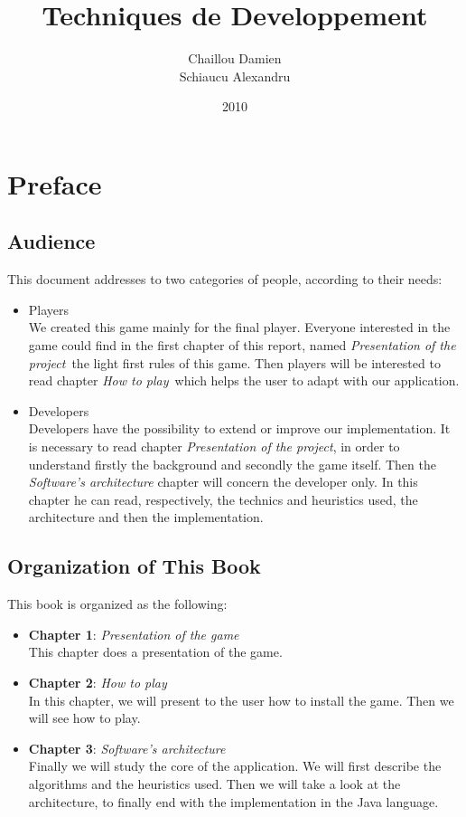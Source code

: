 \documentclass[a4paper,10pt]{report}
\title{Techniques de Developpement}
\author{Chaillou Damien \\ Schiaucu Alexandru}
\date{2010}
\newcommand{\empha}[1]{\textbf{\color{blue}{#1}}}
\begin{document}
	\maketitle
	\tableofcontents


	\chapter*{Preface}

		\section{Audience}
			
			This document addresses to two categories of people, according to their needs:
			\begin{itemize}
				\item Players\\
					We created this game mainly for the final player. Everyone interested in the \empha{Go} game could find in the first chapter of this report, named  \textsl{Presentation of the project}\ the light first rules of this game. Then players will be interested to read chapter \textsl{How to play}\, which helps the user to adapt with our application.

				\item Developers\\
					Developers have the possibility to extend or improve our implementation. It is necessary to read chapter \textsl{Presentation of the project}, in order to understand firstly the background and secondly the game itself. Then the \textsl{Software's architecture} chapter will concern the developer only. In this chapter he can read, respectively, the technics and heuristics used, the architecture and then the implementation.
			\end{itemize}		
			
		\section{Organization of This Book}
			This book is organized as the following:
			\begin{itemize}
				\item \textbf{Chapter 1}: \textsl{Presentation of the game}\\ 
					This chapter does a presentation of the \empha{Go} game.
				\item \textbf{Chapter 2}: \textsl{How to play}\\
					In this chapter, we will present to the user how to install the game. Then we will see how to play.

				\item \textbf{Chapter 3}: \textsl{Software's architecture}\\
					Finally we will study the core of the application. We will first describe the algorithms and the heuristics used. Then we will take a look at the architecture, to finally end with the implementation in the Java language.
 

			\end{itemize}		
			
\end{document}
